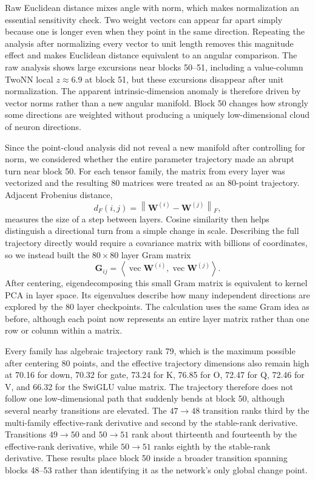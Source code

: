 \documentclass[11pt]{article}
\newcommand{\mat}[1]{\mathbf{#1}}
\begin{document}
Raw Euclidean distance mixes angle with norm, which makes normalization an essential sensitivity check. Two weight vectors can appear far apart simply because one is longer even when they point in the same direction. Repeating the analysis after normalizing every vector to unit length removes this magnitude effect and makes Euclidean distance equivalent to an angular comparison. The raw analysis shows large excursions near blocks 50--51, including a value-column TwoNN local $z\approx6.9$ at block 51, but these excursions disappear after unit normalization. The apparent intrinsic-dimension anomaly is therefore driven by vector norms rather than a new angular manifold. Block 50 changes how strongly some directions are weighted without producing a uniquely low-dimensional cloud of neuron directions.

Since the point-cloud analysis did not reveal a new manifold after controlling for norm, we considered whether the entire parameter trajectory made an abrupt turn near block 50. For each tensor family, the matrix from every layer was vectorized and the resulting 80 matrices were treated as an 80-point trajectory. Adjacent Frobenius distance,
\begin{equation}
d_F(i,j)=\left\|\mat{W}^{(i)}-\mat{W}^{(j)}\right\|_F,
\end{equation}
measures the size of a step between layers. Cosine similarity then helps distinguish a directional turn from a simple change in scale. Describing the full trajectory directly would require a covariance matrix with billions of coordinates, so we instead built the $80\times80$ layer Gram matrix
\begin{equation}
\mat{G}_{ij}=\left\langle\operatorname{vec}\mat{W}^{(i)},
\operatorname{vec}\mat{W}^{(j)}\right\rangle.
\end{equation}
After centering, eigendecomposing this small Gram matrix is equivalent to kernel PCA in layer space. Its eigenvalues describe how many independent directions are explored by the 80 layer checkpoints. The calculation uses the same Gram idea as before, although each point now represents an entire layer matrix rather than one row or column within a matrix.

Every family has algebraic trajectory rank 79, which is the maximum possible after centering 80 points, and the effective trajectory dimensions also remain high at 70.16 for down, 70.32 for gate, 73.24 for K, 76.85 for O, 72.47 for Q, 72.46 for V, and 66.32 for the SwiGLU value matrix. The trajectory therefore does not follow one low-dimensional path that suddenly bends at block 50, although several nearby transitions are elevated. The $47\rightarrow48$ transition ranks third by the multi-family effective-rank derivative and second by the stable-rank derivative. Transitions $49\rightarrow50$ and $50\rightarrow51$ rank about thirteenth and fourteenth by the effective-rank derivative, while $50\rightarrow51$ ranks eighth by the stable-rank derivative. These results place block 50 inside a broader transition spanning blocks 48--53 rather than identifying it as the network's only global change point.
\end{document}

